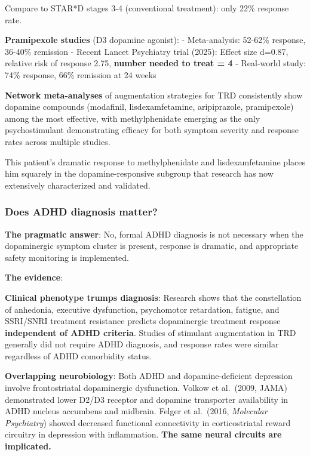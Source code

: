 Compare to STAR*D stages 3-4 (conventional treatment): only 22\% response rate.

\textbf{Pramipexole studies} (D3 dopamine agonist): - Meta-analysis: 52-62\% response, 36-40\% remission - Recent Lancet Psychiatry trial (2025): Effect size d=0.87, relative risk of response 2.75, \textbf{number needed to treat = 4} - Real-world study: 74\% response, 66\% remission at 24 weeks

\textbf{Network meta-analyses} of augmentation strategies for TRD consistently show dopamine compounds (modafinil, lisdexamfetamine, aripiprazole, pramipexole) among the most effective, with methylphenidate emerging as the only psychostimulant demonstrating efficacy for both symptom severity and response rates across multiple studies.

This patient's dramatic response to methylphenidate and lisdexamfetamine places him squarely in the dopamine-responsive subgroup that research has now extensively characterized and validated.

\subsubsection{Does ADHD diagnosis matter?}\label{10a_trd_basis-does-adhd-diagnosis-matter}

\textbf{The pragmatic answer}: No, formal ADHD diagnosis is not necessary when the dopaminergic symptom cluster is present, response is dramatic, and appropriate safety monitoring is implemented.

\textbf{The evidence}:

\textbf{Clinical phenotype trumps diagnosis}: Research shows that the constellation of anhedonia, executive dysfunction, psychomotor retardation, fatigue, and SSRI/SNRI treatment resistance predicts dopaminergic treatment response \textbf{independent of ADHD criteria}. Studies of stimulant augmentation in TRD generally did not require ADHD diagnosis, and response rates were similar regardless of ADHD comorbidity status.

\textbf{Overlapping neurobiology}: Both ADHD and dopamine-deficient depression involve frontostriatal dopaminergic dysfunction. Volkow et al.~(2009, JAMA) demonstrated lower D2/D3 receptor and dopamine transporter availability in ADHD nucleus accumbens and midbrain. Felger et al.~(2016, \emph{Molecular Psychiatry}) showed decreased functional connectivity in corticostriatal reward circuitry in depression with inflammation. \textbf{The same neural circuits are implicated.}

